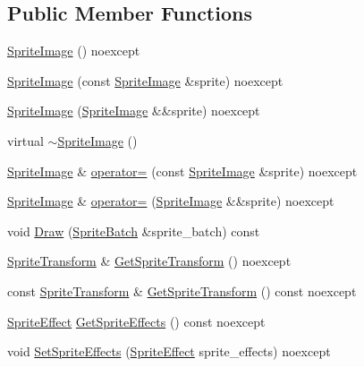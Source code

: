 \subsection*{Public Member Functions}
\begin{DoxyCompactItemize}
\item 
\hyperlink{classmage_1_1_sprite_image_aee1a41099068c4037f29e98b7c5d84ae}{Sprite\+Image} () noexcept
\item 
\hyperlink{classmage_1_1_sprite_image_a707cc96ae9b15fd85ce0c70d1eed458d}{Sprite\+Image} (const \hyperlink{classmage_1_1_sprite_image}{Sprite\+Image} \&sprite) noexcept
\item 
\hyperlink{classmage_1_1_sprite_image_aedd0892075000cb3217550d1a924f926}{Sprite\+Image} (\hyperlink{classmage_1_1_sprite_image}{Sprite\+Image} \&\&sprite) noexcept
\item 
virtual \hyperlink{classmage_1_1_sprite_image_a9121ee110f7e64ee6e936e0d3350ab44}{$\sim$\+Sprite\+Image} ()
\item 
\hyperlink{classmage_1_1_sprite_image}{Sprite\+Image} \& \hyperlink{classmage_1_1_sprite_image_a7596ba158f703bb255e9ba3f20fb04bd}{operator=} (const \hyperlink{classmage_1_1_sprite_image}{Sprite\+Image} \&sprite) noexcept
\item 
\hyperlink{classmage_1_1_sprite_image}{Sprite\+Image} \& \hyperlink{classmage_1_1_sprite_image_a0938a287bb8c78373d60a89ecc880561}{operator=} (\hyperlink{classmage_1_1_sprite_image}{Sprite\+Image} \&\&sprite) noexcept
\item 
void \hyperlink{classmage_1_1_sprite_image_ae30d3293931f674fea17008063755bb6}{Draw} (\hyperlink{classmage_1_1_sprite_batch}{Sprite\+Batch} \&sprite\+\_\+batch) const
\item 
\hyperlink{classmage_1_1_sprite_transform}{Sprite\+Transform} \& \hyperlink{classmage_1_1_sprite_image_a6293955aa7912f8bf846407ee5d0cfa2}{Get\+Sprite\+Transform} () noexcept
\item 
const \hyperlink{classmage_1_1_sprite_transform}{Sprite\+Transform} \& \hyperlink{classmage_1_1_sprite_image_a109a0bd7938b91944b42a2969bb9bdf7}{Get\+Sprite\+Transform} () const noexcept
\item 
\hyperlink{namespacemage_a9cfe18123066ba4236f548f9de75d881}{Sprite\+Effect} \hyperlink{classmage_1_1_sprite_image_a6cfc44918ef3076983e6e1f03de612c8}{Get\+Sprite\+Effects} () const noexcept
\item 
void \hyperlink{classmage_1_1_sprite_image_a81f8297413245635b505374068abe588}{Set\+Sprite\+Effects} (\hyperlink{namespacemage_a9cfe18123066ba4236f548f9de75d881}{Sprite\+Effect} sprite\+\_\+effects) noexcept

\end{DoxyCompactItemize}
